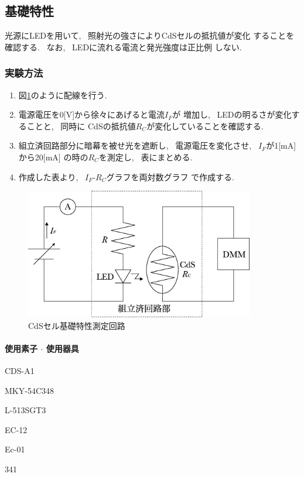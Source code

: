 \documentclass[titlepage]{jsarticle}
\begin{document}
    \subsection{基礎特性}
        光源にLEDを用いて, ~照射光の強さによりCdSセルの抵抗値が変化
        することを確認する. ~なお, ~LEDに流れる電流と発光強度は正比例
        しない.

        \subsubsection{実験方法}
            \begin{enumerate}
                \item 図\ref{fig:基礎特性}のように配線を行う.
                \item 電源電圧を0[V]から徐々にあげると電流$I_F$が
                    増加し, ~LEDの明るさが変化することと, ~同時に
                    CdSの抵抗値$R_C$が変化していることを確認する.
                \item 組立済回路部分に暗幕を被せ光を遮断し,
                    ~電源電圧を変化させ, ~$I_F$が1[mA]から20[mA]
                    の時の$R_C$を測定し, ~表にまとめる.
                \item 作成した表より, ~$I_F$-$R_C$グラフを両対数グラフ
                    で作成する.
            \end{enumerate}

            \begin{figure}[ht]
                \centering
                \includegraphics[width=10cm]{images/CdS_circuit.eps}
                \caption{CdSセル基礎特性測定回路}
                \label{fig:基礎特性}
            \end{figure}

            \paragraph{使用素子 $\cdot$ 使用器具}
                \begin{description}
                    \setlength{\leftskip}{1.5em}
                    \item[組立済回路] CDS-A1
                    \item[CdSセル] MKY-54C348
                    \item[LED] L-513SGT3
                    \item[デジタルマルチメータ] EC-12
                    \item[直流電源] Ec-01
                    \item[電流計] 341 
                \end{description}
                
\end{document}
